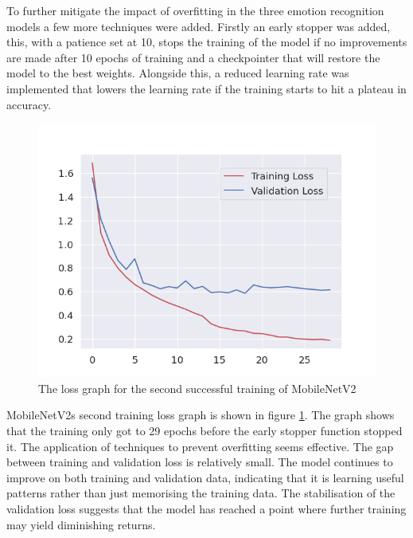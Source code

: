 To further mitigate the impact of overfitting in the three emotion recognition models a few more techniques were added. Firstly an early stopper was added, this, with a patience set at 10, stops the training of the model if no improvements are made after 10 epochs of training and a checkpointer that will restore the model to the best weights. Alongside this, a reduced learning rate was implemented that lowers the learning rate if the training starts to hit a plateau in accuracy.

\begin{figure}[H]
    \centering{}
    \includegraphics[scale=0.5]{fed_images/train_loss_MobileNetv2_ofp.png}
    \caption{The loss graph for the second successful training of MobileNetV2}
    \label{figure:loss_mnv2_ofp}
\end{figure}

MobileNetV2s second training loss graph is shown in figure \ref{figure:loss_mnv2_ofp}. The graph shows that the training only got to 29 epochs before the early stopper function stopped it. The application of techniques to prevent overfitting seems effective. The gap between training and validation loss is relatively small. The model continues to improve on both training and validation data, indicating that it is learning useful patterns rather than just memorising the training data. The stabilisation of the validation loss suggests that the model has reached a point where further training may yield diminishing returns.

